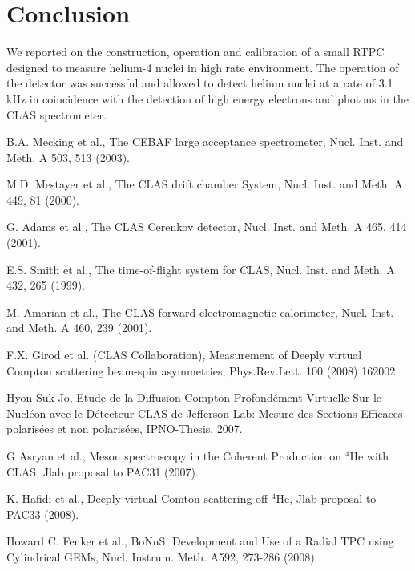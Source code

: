 \documentclass[preprint,5p]{elsarticle}
\begin{document}
 \section{Conclusion}

We reported on the construction, operation and calibration of a small RTPC 
designed to measure helium-4 nuclei in high rate environment. The operation
of the detector was successful and allowed to detect helium nuclei at a rate
of 3.1 kHz in coincidence with the detection of high energy electrons and 
photons in the CLAS spectrometer. 

  

\begin{thebibliography}{99}

   B.A. Mecking et al., The CEBAF large acceptance spectrometer, Nucl. Inst. 
   and Meth. A 503, 513 (2003).

   M.D. Mestayer et al., The CLAS drift chamber System, Nucl. Inst.  and Meth.  
   A 449, 81 (2000).

   G. Adams et al., The CLAS Cerenkov detector, Nucl. Inst. and Meth. A 465, 
   414 (2001).

   E.S. Smith et al., The time-of-flight system for CLAS, Nucl.  Inst. and 
   Meth. A 432, 265 (1999).

   M. Amarian et al., The CLAS forward electromagnetic calorimeter, Nucl.  
   Inst. and Meth. A 460, 239 (2001). 

   F.X. Girod et al. (CLAS Collaboration), Measurement of Deeply virtual Compton 
   scattering beam-spin asymmetries, Phys.Rev.Lett. 100 (2008) 162002

   Hyon-Suk Jo, Etude de la Diffusion Compton Profond{\'e}ment Virtuelle Sur le 
   Nucl{\'e}on avec le D{\'e}tecteur CLAS de Jefferson Lab: Mesure des Sections 
   Efficaces polaris{\'e}es et non polaris{\'e}es, IPNO-Thesis, 2007.

   G Asryan et al., Meson spectroscopy in the Coherent Production on $^{4}$He with CLAS, Jlab 
   proposal to PAC31 (2007).

   K. Hafidi et al., Deeply virtual Comton scattering off $^{4}$He, Jlab 
   proposal to PAC33 (2008).

   Howard C. Fenker et al., BoNuS: Development and Use of a Radial TPC using 
   Cylindrical GEMs, Nucl. Instrum. Meth. A592, 273-286 (2008)


\end{thebibliography}
\end{document}
